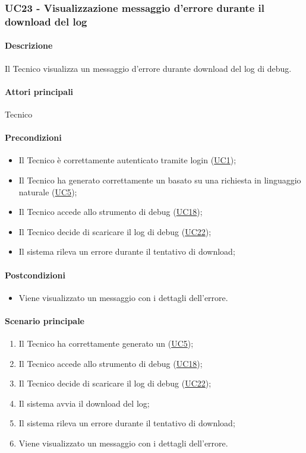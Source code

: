 \subsubsection{UC23 - Visualizzazione messaggio d'errore durante il download del log}\label{UC23}
\paragraph*{Descrizione}
Il Tecnico visualizza un messaggio d'errore durante download del log di debug.

\paragraph*{Attori principali}
Tecnico

\paragraph*{Precondizioni}
\begin{itemize}
  \item Il Tecnico è correttamente autenticato tramite login (\hyperref[UC1]{UC1});
  \item Il Tecnico ha generato correttamente un  basato su una richiesta in linguaggio naturale (\hyperref[UC5]{UC5});
  \item Il Tecnico accede allo strumento di debug (\hyperref[UC18]{UC18});
  \item Il Tecnico decide di scaricare il log di debug (\hyperref[UC22]{UC22});
  \item Il sistema rileva un errore durante il tentativo di download;
\end{itemize}

\paragraph*{Postcondizioni}
\begin{itemize}
  \item Viene visualizzato un messaggio con i dettagli dell'errore.
\end{itemize}

\paragraph*{Scenario principale}
\begin{enumerate}
  \item Il Tecnico ha correttamente generato un  (\hyperref[UC5]{UC5});
  \item Il Tecnico accede allo strumento di debug (\hyperref[UC18]{UC18});
  \item Il Tecnico decide di scaricare il log di debug (\hyperref[UC22]{UC22});
  \item Il sistema avvia il download del log;
  \item Il sistema rileva un errore durante il tentativo di download;
  \item Viene visualizzato un messaggio con i dettagli dell'errore.
\end{enumerate}
